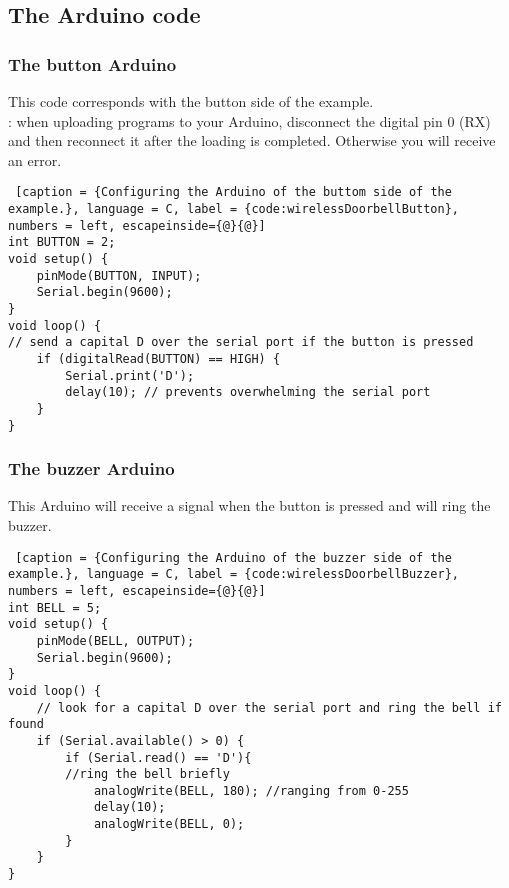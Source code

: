 \subsection{The Arduino code}
\subsubsection{The button Arduino}
This code corresponds with the button side of the example.
\\
{\color{red}{There's a trap!}}: when uploading programs to your Arduino, disconnect the digital pin 0 (RX) and then reconnect it after the loading is completed. Otherwise you will receive an error.

\begin{lstlisting} [caption = {Configuring the Arduino of the buttom side of the example.}, language = C, label = {code:wirelessDoorbellButton}, numbers = left, escapeinside={@}{@}] 
int BUTTON = 2;
void setup() { 
	pinMode(BUTTON, INPUT); 
	Serial.begin(9600);
}
void loop() {
// send a capital D over the serial port if the button is pressed
	if (digitalRead(BUTTON) == HIGH) { 
		Serial.print('D');
		delay(10); // prevents overwhelming the serial port 
	}
}
\end{lstlisting}

\subsubsection{The buzzer Arduino}
This Arduino will receive a signal when the button is pressed and will ring the buzzer.

\begin{lstlisting} [caption = {Configuring the Arduino of the buzzer side of the example.}, language = C, label = {code:wirelessDoorbellBuzzer}, numbers = left, escapeinside={@}{@}]
int BELL = 5;
void setup() { 
	pinMode(BELL, OUTPUT); 
	Serial.begin(9600);
}
void loop() {
	// look for a capital D over the serial port and ring the bell if found 
	if (Serial.available() > 0) {
		if (Serial.read() == 'D'){ 
		//ring the bell briefly 
			analogWrite(BELL, 180); //ranging from 0-255
			delay(10); 
			analogWrite(BELL, 0);
		}		 
	}
}
\end{lstlisting}

